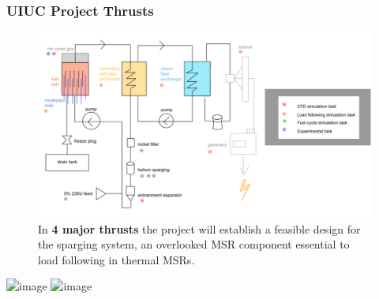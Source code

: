 \begin{frame}
\frametitle{UIUC Project Thrusts}
\begin{figure}
\includegraphics[width=\textwidth]{./images/system-diag.png}
        \caption{In \textbf{4 major thrusts} the project will establish a 
        feasible design for the sparging system, an overlooked MSR component 
        essential to load following in thermal MSRs.}
\end{figure}

\end{frame}


\begin{frame}

\begin{table}
\includegraphics<1>[width=\linewidth]{./images/load-follow.png}
\includegraphics<2>[width=\linewidth]{./images/load-follow-this-work.png}
        \caption{}
\end{table}
\end{frame}




